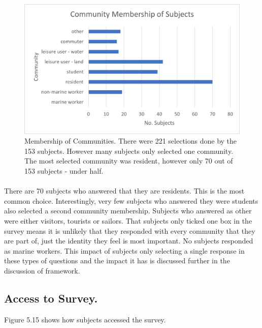 \begin{figure}[H]
    \centering
    \includegraphics{fig_results/com-mem-horizontal.png}
    \caption{Membership of Communities. There were 221 selections done by the 153 subjects. However many subjects only selected one community. The most selected community was resident, however only 70 out of 153 subjects - under half. }
    \label{fig:my_label}
\end{figure}
\paragraph{}

There are 70 subjects who answered that they are residents. This is the most common choice. Interestingly, very few subjects who answered they were students also selected a second community membership. Subjects who answered as other were either visitors, tourists or sailors. That subjects only ticked one box in the survey means it is unlikely that they responded with every community that they are part of, just the identity they feel is most important. No subjects responded as marine workers. This impact of subjects only selecting a single response in these types of questions and the impact it has is discussed further in the discussion of framework. 


\subsection{Access to Survey. }
Figure 5.15 shows how subjects accessed the survey.  

